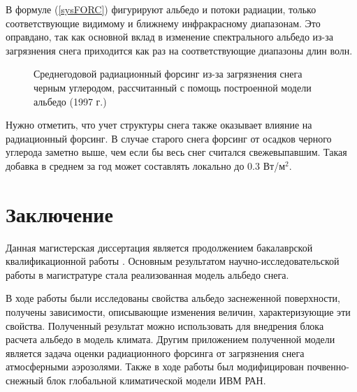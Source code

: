 \documentclass[a4paper, fontsize=14pt]{scrartcl}
\begin{document}
В формуле (\ref{sysFORC}) фигурируют альбедо и потоки радиации, только соответствующие видимому и ближнему инфракрасному диапазонам. Это оправдано, так как основной вклад в изменение спектрального альбедо из-за загрязнения снега приходится как раз на соответствующие диапазоны длин волн.

\begin{figure}[h]
    \caption{Среднегодовой радиационный форсинг из-за загрязнения снега черным углеродом, рассчитанный с помощь построенной модели альбедо (1997 г.)}
    \label{fig:image}
\end{figure}

Нужно отметить, что учет структуры снега также оказывает влияние на радиационный форсинг. В случае старого снега форсинг от осадков черного углерода заметно выше, чем если бы весь снег считался свежевыпавшим. Такая добавка в среднем за год может составлять локально до $0.3$ Вт/м$^2$. 



\newpage
\section*{Заключение}

Данная магистерская диссертация является продолжением бакалаврской квалификационной работы \cite{Bak2019}. Основным результатом научно-исследовательской работы в магистратуре стала реализованная модель альбедо снега. 

В ходе работы были исследованы свойства альбедо заснеженной поверхности, получены зависимости, описывающие изменения величин, характеризующие эти свойства. Полученный результат можно использовать для внедрения блока расчета альбедо в модель климата. Другим приложением полученной модели является задача оценки радиационного форсинга от загрязнения снега атмосферными аэрозолями. Также в ходе работы был модифицирован почвенно-снежный блок глобальной климатической модели ИВМ РАН. 




\newpage
{}
{}


\end{document}
